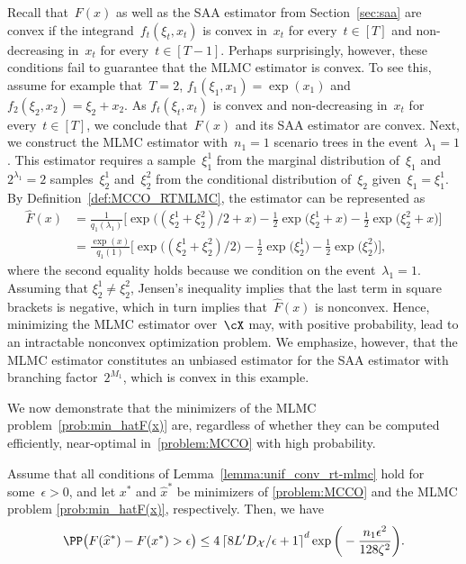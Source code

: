 \documentclass[11pt]{article}
\let\hat\widehat
\begin{document}
\begin{rem}
    Recall that~$F(x)$ as well as the SAA estimator from Section~\ref{sec:saa} are convex if the integrand~$f_t(\xi_t, x_t)$ is convex in~$x_t$ for every~$t \in [T]$ and non-decreasing in~$x_t$ for every~$t \in [T-1]$. Perhaps surprisingly, however, these conditions fail to guarantee that the MLMC estimator is convex. To see this, assume for example that~$T=2$, $f_1(\xi_1,x_1)=\exp(x_1)$ and $f_2(\xi_2,x_2)=\xi_2+x_2$. As $f_t(\xi_t,x_t)$ is convex and non-decreasing in~$x_t$ for every~$t\in[T]$, we conclude that~$F(x)$ and its SAA estimator are convex. Next, we construct the MLMC estimator with~$n_1=1$ scenario trees in the event~$\lambda_1=1$. This estimator requires a sample~$\xi_1^1$ from the marginal distribution of~$\xi_1$ and~$2^{\lambda_1}=2$ samples~$\xi_2^1$ and~$\xi_2^2$ from the conditional distribution of~$\xi_2$ given~$\xi_1=\xi_1^1$. By Definition~\ref{def:MCCO_RTMLMC}, the estimator can be represented as
    \begin{align*}
        \hat F(x)& = \frac{1}{q_1(\lambda_1)}\Big[\exp\big((\xi_2^1 + \xi_2^2)/2 +x \big) - \frac{1}{2}\exp\big(\xi_2^1+x \big) - \frac{1}{2}\exp\big( \xi_2^2+x \big) \Big]\\
        &= \frac{\exp(x)}{q_1(1)} \Big[ \exp\big((\xi_2^1 + \xi_2^2 )/2 \big) - \frac{1}{2}\exp\big(\xi_2^1 \big) - \frac{1}{2}\exp\big(\xi_2^2 \big) \Big],
    \end{align*}
    where the second equality holds because we condition on the event~$\lambda_1=1$. Assuming that $\xi_2^1\neq \xi_2^2$, Jensen's inequality implies that the last term in square brackets is negative, which in turn implies that~$\hat{F}(x)$ is nonconvex. Hence, minimizing the MLMC estimator over~$\cX$ may, with positive probability, lead to an intractable nonconvex optimization problem. We emphasize, however, that the MLMC estimator constitutes an unbiased estimator for the SAA estimator with branching factor~$2^{M_1}$, which is convex in this example. 
\end{rem}

We now demonstrate that the minimizers of the MLMC problem~\eqref{prob:min_hatF(x)} are, regardless of whether they can be computed efficiently, near-optimal in~\eqref{problem:MCCO} with high probability.


\begin{corollary}\label{cor:high_prob_conv_rtmlmc}
Assume that all conditions of Lemma~\ref{lemma:unif_conv_rt-mlmc} hold for some~$\epsilon>0$, and let $x^*$ and $\hat{x}^*$ be minimizers of \eqref{problem:MCCO} and the MLMC problem \eqref{prob:min_hatF(x)}, respectively. Then, we have
\begin{align*}
    \PP\big( F(\hat{x}^*) - F(x^*) > \epsilon \big) \leq 4\left\lceil 8L' D_\mathcal{X}/\epsilon +1\right\rceil^{d} \exp\bigg(- \frac{n_1\epsilon^2}{128\zeta^2} \bigg).
\end{align*}   
\end{corollary}
\end{document}
